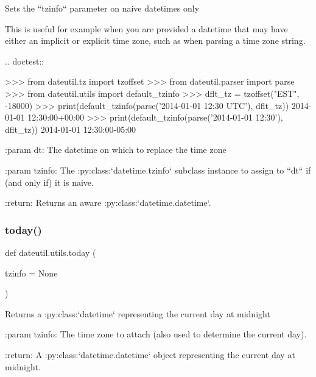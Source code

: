 \begin{DoxyVerb}Sets the ``tzinfo`` parameter on naive datetimes only

This is useful for example when you are provided a datetime that may have
either an implicit or explicit time zone, such as when parsing a time zone
string.

.. doctest::

    >>> from dateutil.tz import tzoffset
    >>> from dateutil.parser import parse
    >>> from dateutil.utils import default_tzinfo
    >>> dflt_tz = tzoffset("EST", -18000)
    >>> print(default_tzinfo(parse('2014-01-01 12:30 UTC'), dflt_tz))
    2014-01-01 12:30:00+00:00
    >>> print(default_tzinfo(parse('2014-01-01 12:30'), dflt_tz))
    2014-01-01 12:30:00-05:00

:param dt:
    The datetime on which to replace the time zone

:param tzinfo:
    The :py:class:`datetime.tzinfo` subclass instance to assign to
    ``dt`` if (and only if) it is naive.

:return:
    Returns an aware :py:class:`datetime.datetime`.
\end{DoxyVerb}
 \mbox{\label{namespacedateutil_1_1utils_ab4fd4b6f7d7b12a852d640ff84aa9191}} 
\subsubsection{\texorpdfstring{today()}{today()}}
{\footnotesize\ttfamily def dateutil.\+utils.\+today (\begin{DoxyParamCaption}\item[{}]{tzinfo = {\ttfamily None} }\end{DoxyParamCaption})}

\begin{DoxyVerb}Returns a :py:class:`datetime` representing the current day at midnight

:param tzinfo:
    The time zone to attach (also used to determine the current day).

:return:
    A :py:class:`datetime.datetime` object representing the current day
    at midnight.
\end{DoxyVerb}
 \mbox{\label{namespacedateutil_1_1utils_a6cae45aff4256b0744d058258dc3863a}} 
